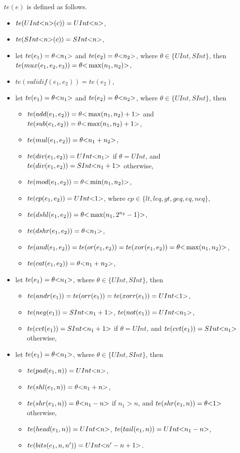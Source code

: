 $te(e)$ is defined as follows. 
\begin{itemize}
\item $te(UInt\mbox{<}n\mbox{>}(c)) = UInt\mbox{<}n\mbox{>}$, \item $te(SInt\mbox{<}n\mbox{>}(c)) = SInt\mbox{<}n\mbox{>}$, 
%
\item let $te(e_1) = \theta \mbox{<} n_1 \mbox{>}$ and $te(e_2) = \theta \mbox{<} n_2 \mbox{>}$, where $\theta \in \{UInt, SInt\}$, then $te(mux(e_1, e_2, e_3)) = \theta\mbox{<} \max(n_1, n_2) \mbox{>}$,
%
\item $te(validif(e_1, e_2)) = te(e_2)$,
%
\item let $te(e_1) = \theta \mbox{<} n_1 \mbox{>}$ and $te(e_2) = \theta \mbox{<} n_2 \mbox{>}$, where $\theta \in \{UInt, SInt\}$, then 
\begin{itemize}
\item $te(add(e_1, e_2)) =\theta \mbox{<} \max(n_1, n_2)+1 \mbox{>}$ and $te(sub(e_1, e_2)) = \theta \mbox{<} \max(n_1, n_2)+1 \mbox{>}$, 
%
\item $te(mul(e_1, e_2)) = \theta \mbox{<} n_1+n_2 \mbox{>}$,
%
\item $te(div(e_1, e_2)) = UInt \mbox{<} n_1 \mbox{>}$ if $\theta = UInt$, and $te(div(e_1, e_2)) = SInt \mbox{<} n_1+1 \mbox{>}$ otherwise,
%
\item $te(mod(e_1, e_2)) = \theta \mbox{<} \min(n_1,n_2) \mbox{>}$,
%
\item $te(cp(e_1, e_2)) = UInt \mbox{<} 1 \mbox{>}$, where $cp \in \{lt, leq, gt, geq, eq, neq\}$,
%
\item $te(dshl(e_1, e_2)) = \theta \mbox{<} \max(n_1, 2^{n_2}-1) \mbox{>}$, 
%
\item $te(dshr(e_1, e_2)) = \theta \mbox{<} n_1 \mbox{>}$, 
%
\item $te(and(e_1, e_2)) = te(or(e_1, e_2)) =  te(xor(e_1, e_2)) = \theta \mbox{<} \max(n_1, n_2) \mbox{>}$, 
%
\item $te(cat(e_1, e_2)) = \theta \mbox{<} n_1 + n_2 \mbox{>}$, 
\end{itemize}
%
\item let $te(e_1) = \theta \mbox{<} n_1 \mbox{>}$, where $\theta \in \{UInt, SInt\}$, then 
\begin{itemize}
\item $te(andr(e_1)) = te(orr(e_1)) =  te(xorr(e_1)) = UInt\mbox{<}1\mbox{>}$,
%
\item $te(neg(e_1)) = SInt\mbox{<}n_1 +1\mbox{>}$, $te(not(e_1)) =  UInt\mbox{<}n_1\mbox{>}$, 
%
\item $te(cvt(e_1)) = SInt\mbox{<}n_1 +1\mbox{>}$ if $\theta = UInt$, and $te(cvt(e_1)) =  SInt\mbox{<}n_1\mbox{>}$ otherwise,  
\end{itemize}
%
\item let $te(e_1) = \theta \mbox{<} n_1 \mbox{>}$, where $\theta \in \{UInt, SInt\}$, then
\begin{itemize}
\item $te(pad(e_1, n)) = UInt\mbox{<}n\mbox{>}$,
%
\item $te(shl(e_1,n)) = \theta \mbox{<} n_1 + n \mbox{>}$,  
%
\item $te(shr(e_1, n)) = \theta \mbox{<} n_1-n \mbox{>}$ if $n_1 > n$, and $te(shr(e_1, n)) =  \theta \mbox{<} 1 \mbox{>}$ otherwise,  
%
\item $te(head(e_1, n)) = UInt\mbox{<}n\mbox{>}$, $te(tail(e_1, n)) = UInt\mbox{<}n_1-n\mbox{>}$, 
%
\item $te(bits(e_1, n, n')) = UInt\mbox{<}n'-n+1\mbox{>}$.  
\end{itemize} 
%
\end{itemize}

